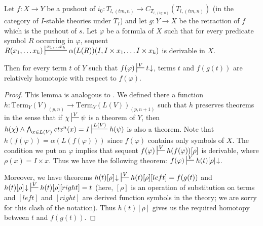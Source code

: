 \documentclass[reqno]{amsart}
\theoremstyle{definition}
\theoremstyle{remark}
\newcommand{\Term}{\mathrm{Term}}
\newcommand{\ty}{\mathit{ty}}
\newcommand{\ctx}{\mathit{ctx}}
\newcommand{\tm}{\mathit{tm}}
\newcommand{\cyli}{i}
\numberwithin{figure}{section}
\begin{document}
\begin{lem}
Let $f : X \to Y$ be a pushout of $\cyli_0 : T_{l,(\tm,n)} \to C_{T_{l,(\ty,n)}}(T_{l,(\tm,n)})$ (in the category of $I$-stable theories under $T_I$)
and let $g : Y \to X$ be the retraction of $f$ which is the pushout of $s$.
Let $\varphi$ be a formula of $X$ such that for every predicate symbol $R$ occurring in $\varphi$,
sequent $R(x_1, \ldots x_k) \sststile{}{x_1, \ldots x_k} \alpha(L(R))(I, I \times x_1, \ldots I \times x_k)$ is derivable in $X$.

Then for every term $t$ of $Y$ such that $f(\varphi) \sststile{}{V} t\!\downarrow$, terms $t$ and $f(g(t))$ are relatively homotopic with respect to $f(\varphi)$.
\end{lem}
\begin{proof}
This lemma is analogous to \cite[Lemma~3.7]{alg-models}.
We defined there a function $h : \Term_Y(V)_{(p,n)} \to \Term_Y(L(V))_{(p,n+1)}$ such that $h$ preserves theorems in the sense that
if $\chi \sststile{}{V} \psi$ is a theorem of $Y$, then $h(\chi) \land \bigwedge_{x \in L(V)} \ctx^n(x) = I \sststile{}{L(V)} h(\psi)$ is also a theorem.
Note that $h(f(\varphi)) = \alpha(L(f(\varphi)))$ since $f(\varphi)$ contains only symbols of $X$.
The condition we put on $\varphi$ implies that sequent $f(\varphi) \sststile{}{V} h(f(\varphi))[\rho]$ is derivable, where $\rho(x) = I \times x$.
Thus we have the following theorem: $f(\varphi) \sststile{}{V} h(t)[\rho]\!\downarrow$.

Moreover, we have theorems $h(t)[\rho]\!\downarrow\ \sststile{}{V} h(t)[\rho][left] = f(g(t))$ and $h(t)[\rho]\!\downarrow\ \sststile{}{V} h(t)[\rho][right] = t$
(here, $[\rho]$ is an operation of substitution on terms and $[left]$ and $[right]$ are derived function symbols in the theory; we are sorry for this clash of the notation).
Thus $h(t)[\rho]$ gives us the required homotopy between $t$ and $f(g(t))$.
\end{proof}
\end{document}
